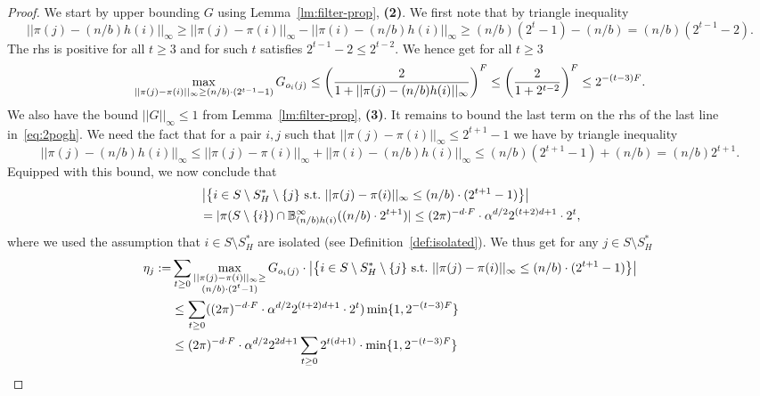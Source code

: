 \begin{proof}
We start by upper bounding $G$ using Lemma~\ref{lm:filter-prop}, {\bf (2)}. We first note that by triangle inequality 
$$
||\pi(j)-(n/b)h(i)||_\infty\geq ||\pi(j)-\pi(i)||_\infty-||\pi(i)-(n/b)h(i)||_\infty\geq (n/b)(2^t-1)-(n/b)= (n/b) (2^{t-1}-2).
$$
The rhs is positive for all $t\geq 3$ and for such $t$ satisfies $2^{t-1}-2\leq 2^{t-2}$. We hence get for all  $t\geq 3$
\begin{equation}\label{eq:g-ubound}
\begin{split}
\max_{||\pi(j)-\pi(i)||_\infty\geq (n/b)\cdot (2^{t-1}-1)} G_{o_i(j)}\leq \left(\frac2{1+||\pi(j)-(n/b)h(i)||_\infty}\right)^{F}\leq \left(\frac2{1+2^{t-2}}\right)^{F}\leq 2^{-(t-3)F}.
\end{split}
\end{equation}
We also have the  bound $||G||_\infty\leq 1$ from Lemma~\ref{lm:filter-prop}, {\bf (3)}. It remains to bound the last term on the rhs of the last line in~\eqref{eq:2pogh}. We need the fact that for a pair $i, j$ such that $||\pi(j)-\pi(i)||_\infty\leq 2^{t+1}-1$ we have by triangle inequality
$$
||\pi(j)-(n/b)h(i)||_\infty\leq ||\pi(j)-\pi(i)||_\infty+||\pi(i)-(n/b)h(i)||_\infty\leq (n/b)(2^{t+1}-1)+(n/b)= (n/b) 2^{t+1}.
$$
Equipped with this bound, we now conclude that
\begin{equation}\label{eq:3hrgrg}
\begin{split}
&\left|\left\{i\in S\setminus S^*_H\setminus \{j\} \text{~s.t.~}||\pi(j)-\pi(i)||_\infty\leq (n/b)\cdot (2^{t+1}-1)\right\}\right|\\
&=|\pi(S\setminus \{i\})\cap \mathbb{B}^\infty_{(n/b) h(i)}((n/b)\cdot 2^{t+1})|\leq (2\pi)^{-d\cdot F}\cdot \alpha^{d/2} 2^{(t+2)d+1}\cdot 2^t,
\end{split}
\end{equation}
where we used the assumption that $i\in S\setminus S^*_H$ are isolated  (see Definition~\ref{def:isolated}). We thus get for any $j\in S\setminus S^*_H$
\begin{equation*}
\begin{split}
\eta_j:=&\sum_{t\geq 0} \max_{\substack{||\pi(j)-\pi(i)||_\infty\geq \\(n/b)\cdot (2^t-1)}} G_{o_i(j)}\cdot \left|\left\{i\in S\setminus S^*_H\setminus \{j\} \text{~s.t.~}||\pi(j)-\pi(i)||_\infty\leq (n/b)\cdot (2^{t+1}-1)\right\}\right|\\
&\leq \sum_{t\geq 0} (\GI\cdot  \alpha^{d/2} 2^{(t+2)d+1}\cdot 2^{t}) \min\{1,  2^{-(t-3)\fc}\} \\
&\leq \GI\cdot  \alpha^{d/2} 2^{2d+1} \sum_{t\geq 0} 2^{t(d+1)}\cdot \min\{1, 2^{-(t-3)\fc}\}\\

\end{split}
\end{equation*}
\end{proof}
